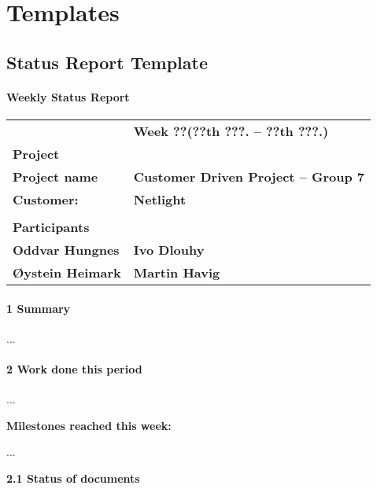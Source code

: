 \appendix



\clearpage

\chapter{Templates}

\section{Status Report Template}
\label{statusreporttemplate}

\subsubsection{Weekly Status Report}

\begin{center}
\begin{tabularx}{\textwidth}{ l X }
\hline
 & \textbf{Week ??(??th ???. – ??th ???.)} \\
\textbf{Project} &  \\ \hline
\textbf{Project name} & \textbf{Customer Driven Project – Group 7} \\
\textbf{Customer:} & \textbf{Netlight} \\ \hline
\\
\textbf{Participants} &  \\ \hline
\textbf{Oddvar Hungnes} & \textbf{Ivo Dlouhy}  \\
\textbf{Øystein Heimark} & \textbf{Martin Havig} \\ \hline
\end{tabularx}
\end{center}

\subsubsection{1 Summary}

...

\subsubsection{2 Work done this period}

...

\textbf{Milestones reached this week:}

...

\textbf{2.1 Status of documents}

